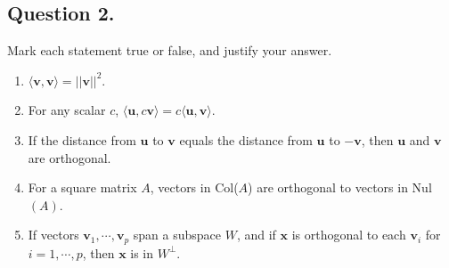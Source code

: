 \documentclass{article}
\begin{document}
\subsection*{Question 2.}
Mark each statement true or false, and justify your answer.
\begin{enumerate} [label=(\arabic*)]
    \item $\langle \mathbf{v},\mathbf{v}\rangle=||\mathbf{v}||^2$.
    \item For any scalar $c$, $\langle \mathbf{u},c\mathbf{v}\rangle=c\langle \mathbf{u},\mathbf{v}\rangle$.
    \item If the distance from $\mathbf{u}$ to $\mathbf{v}$ equals the distance from $\mathbf{u}$ to $\mathbf{-v}$, then $\mathbf{u}$ and $\mathbf{v}$ are orthogonal.
    \item For a square matrix $A$, vectors in Col($A$) are orthogonal to vectors in Nul$(A)$.
    \item If vectors $\mathbf{v}_1,\cdots,\mathbf{v}_p$ span a subspace $W$, and if $\mathbf{x}$ is orthogonal to each $\mathbf{v}_i$ for $i=1,\cdots,p$, then $\mathbf{x}$ is in $W^\perp$.
\end{enumerate}
\end{document}
